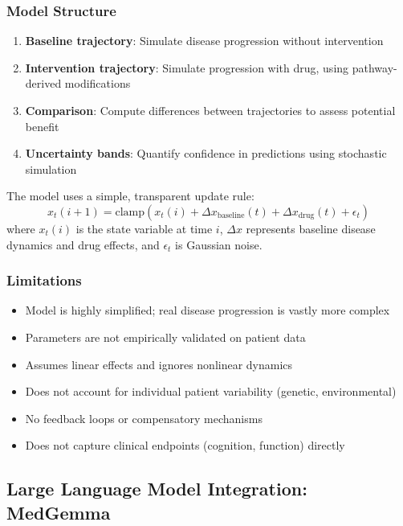 \documentclass[12pt,a4paper]{article}
\begin{document}
\subsubsection{Model Structure}
\begin{enumerate}
  \item \textbf{Baseline trajectory}: Simulate disease progression without intervention
  \item \textbf{Intervention trajectory}: Simulate progression with drug, using pathway-derived modifications
  \item \textbf{Comparison}: Compute differences between trajectories to assess potential benefit
  \item \textbf{Uncertainty bands}: Quantify confidence in predictions using stochastic simulation
\end{enumerate}

The model uses a simple, transparent update rule:
\[
x_t(i+1) = \text{clamp}(x_t(i) + \Delta x_{\text{baseline}}(t) + \Delta x_{\text{drug}}(t) + \epsilon_t)
\]
where $x_t(i)$ is the state variable at time $i$, $\Delta x$ represents baseline disease dynamics and drug effects, and $\epsilon_t$ is Gaussian noise.

\subsubsection{Limitations}
\begin{itemize}
  \item Model is highly simplified; real disease progression is vastly more complex
  \item Parameters are not empirically validated on patient data
  \item Assumes linear effects and ignores nonlinear dynamics
  \item Does not account for individual patient variability (genetic, environmental)
  \item No feedback loops or compensatory mechanisms
  \item Does not capture clinical endpoints (cognition, function) directly
\end{itemize}

\subsection{Large Language Model Integration: MedGemma}
\label{subsec:medgemma}
\end{document}
